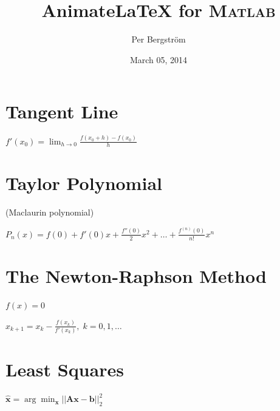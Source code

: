 \documentclass[12pt]{article}
\title{Animate\LaTeX{} for M\textsc{atlab}}
\author{Per Bergstr\"{o}m}
\date{March 05, 2014}
\begin{document}
\maketitle

\section{Tangent Line}

$f'(x_{0})=\displaystyle \lim_{h \rightarrow 0} \frac{f(x_{0}+h)-f(x_{0})}{h}$

\begin{center}

\end{center}

\newpage

\section{Taylor Polynomial}

(Maclaurin polynomial)

\noindent
\vspace{2.5em}$P_n(x)=f(0)+f'(0)x+\displaystyle\frac{f''(0)}{2}x^2+\ldots+\displaystyle\frac{f^{(n)}(0)}{n!}x^n$


\begin{center}

\end{center}

\begin{center}

\end{center}

\newpage

\section{The Newton-Raphson Method}
$f(x)=0$

\noindent
\vspace{2.5em}$x_{k+1}=x_{k}-\displaystyle\frac{f(x_{k})}{f'(x_{k})},\;k=0,1,\ldots$

\begin{center}

\end{center}

\begin{center}

\end{center}

\newpage
\section{Least Squares}
$\hat{\mathbf{x}} = \displaystyle \arg \min_{\mathbf{x}} || \mathbf{A}\mathbf{x}-\mathbf{b} ||_2^2$
\end{document}
